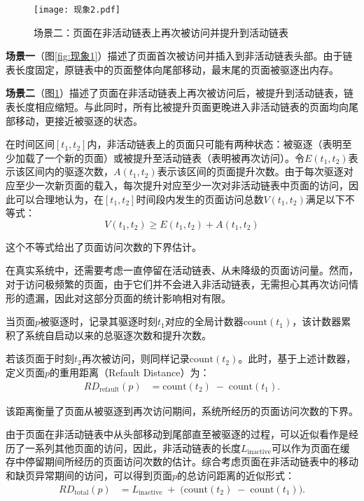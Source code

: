 \begin{figure}[htbp]
  \centering
  \texttt{[image: 现象2.pdf]}
  \caption{场景二：页面在非活动链表上再次被访问并提升到活动链表}
  \label{fig:现象2}
\end{figure}

\textbf{场景一}（图\ref{fig:现象1}）描述了页面首次被访问并插入到非活动链表头部。由于链表长度固定，原链表中的页面整体向尾部移动，最末尾的页面被驱逐出内存。

\textbf{场景二}（图\ref{fig:现象2}）描述了页面在非活动链表上再次被访问后，被提升到活动链表，链表长度相应缩短。与此同时，所有比被提升页面更晚进入非活动链表的页面均向尾部移动，更接近被驱逐的状态。

在时间区间\([t_1, t_2]\)内，非活动链表上的页面只可能有两种状态：被驱逐（表明至少加载了一个新的页面）或被提升至活动链表（表明被再次访问）。令\(E(t_1,t_2)\)表示该区间内的驱逐次数，\(A(t_1,t_2)\)表示该区间的页面提升次数。由于每次驱逐对应至少一次新页面的载入，每次提升对应至少一次对非活动链表中页面的访问，因此可以合理地认为，在\([t_1,t_2]\)时间段内发生的页面访问总数\(V(t_1, t_2)\)满足以下不等式：
\[
V(t_1, t_2) \ge E(t_1,t_2) + A(t_1,t_2)
\]

这个不等式给出了页面访问次数的下界估计。

在真实系统中，还需要考虑一直停留在活动链表、从未降级的页面访问量。然而，对于访问极频繁的页面，由于它们并不会进入非活动链表，无需担心其再次访问情形的遗漏，因此对这部分页面的统计影响相对有限。

当页面\(p\)被驱逐时，记录其驱逐时刻\(t_1\)对应的全局计数器\(\mathrm{count}(t_1)\)，该计数器累积了系统自启动以来的总驱逐次数和提升次数。

若该页面于时刻\(t_2\)再次被访问，则同样记录\(\mathrm{count}(t_2)\)。此时，基于上述计数器，定义页面\(p\)的重用距离（Refault Distance）为：
\begin{align}
  \label{eq:refault_distance}
  RD_{\mathrm{refault}}(p)
  &= 
  \mathrm{count}(t_2)
  \;-\;
  \mathrm{count}(t_1).
\end{align}

该距离衡量了页面从被驱逐到再次访问期间，系统所经历的页面访问次数的下界。

由于页面在非活动链表中从头部移动到尾部直至被驱逐的过程，可以近似看作是经历了一系列其他页面的访问，因此，非活动链表的长度\(L_{\mathrm{inactive}}\)可以作为页面在缓存中停留期间所经历的页面访问次数的估计。综合考虑页面在非活动链表中的移动和缺页异常期间的访问，可以得到页面\(p\)的总访问距离的近似形式：
\begin{align}
  \label{eq:dtotal}
  RD_{\mathrm{total}}(p)
  &= 
  L_{\mathrm{inactive}}
  \;+\;
  \bigl(\mathrm{count}(t_2) \;-\; \mathrm{count}(t_1)\bigr).
\end{align}

